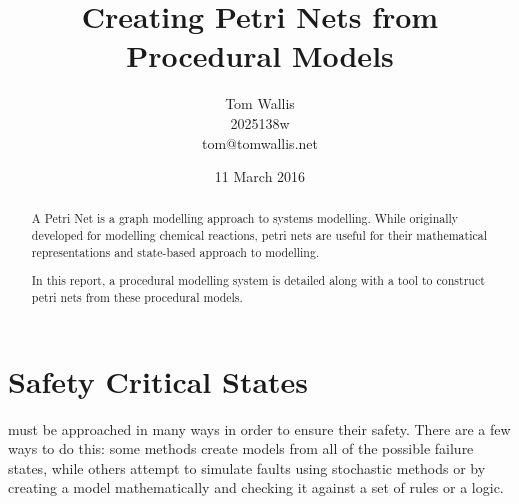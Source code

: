 \documentclass{tufte-handout}
\title{Creating Petri Nets from Procedural Models}
\author{Tom Wallis\\2025138w\\tom@tomwallis.net}
\date{11 March 2016}  %
\begin{document}
\maketitle%

\begin{abstract}
A Petri Net is a graph modelling approach to systems modelling. While originally developed for modelling chemical reactions, petri nets are useful for their mathematical representations and state-based approach to modelling. \par
In this report, a procedural modelling system is detailed along with a tool to construct petri nets from these procedural models. 
\end{abstract}
\newpage


\tableofcontents
\newpage


\section{Safety Critical States}
must be approached in many ways in order to ensure their safety. There are a few ways to do this: some methods create models from all of the possible failure states, while others attempt to simulate faults using stochastic methods or by creating a model mathematically and checking it against a set of rules or a logic. \par
\end{document}
